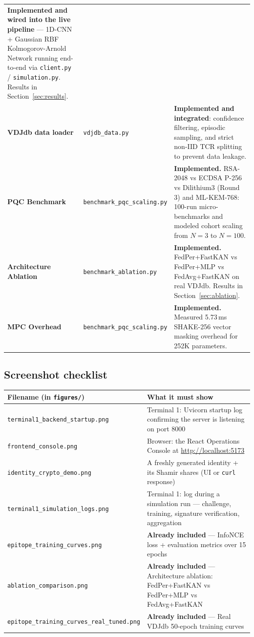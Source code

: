 \documentclass[11pt,a4paper]{article}
\begin{document}
\begin{center}
\begin{longtable}{@{}p{3.6cm}p{4.0cm}p{6.6cm}@{}}
\textbf{Implemented and wired into the live pipeline} --- 1D-CNN + Gaussian RBF Kolmogorov-Arnold Network running end-to-end via \lstinline|client.py| / \lstinline|simulation.py|. Results in Section~\ref{sec:results}. \\
\textbf{VDJdb data loader} & \lstinline|vdjdb_data.py| & \textbf{Implemented
and integrated}: confidence filtering, episodic sampling, and strict non-IID
TCR splitting to prevent data leakage. \\
\textbf{PQC Benchmark} & \lstinline|benchmark_pqc_scaling.py| & \textbf{Implemented.}
RSA-2048 vs ECDSA P-256 vs Dilithium3 (Round 3) and ML-KEM-768: 100-run micro-benchmarks and modeled cohort scaling from $N=3$ to $N=100$. \\
\textbf{Architecture Ablation} & \lstinline|benchmark_ablation.py| &
\textbf{Implemented.} FedPer+FastKAN vs FedPer+MLP vs FedAvg+FastKAN on
real VDJdb. Results in Section~\ref{sec:ablation}. \\
\textbf{MPC Overhead} & \lstinline|benchmark_pqc_scaling.py| & \textbf{Implemented.}
Measured 5.73\,ms SHAKE-256 vector masking overhead for 252K parameters. \\
\bottomrule
\end{longtable}
\end{center}

\subsection*{Screenshot checklist}
\begin{center}
\begin{longtable}{@{}p{5.5cm}p{7.5cm}@{}}
\toprule
\textbf{Filename (in \texttt{figures/})} & \textbf{What it must show} \\
\midrule
\endhead
\lstinline|terminal1_backend_startup.png| & Terminal 1: Uvicorn startup log
confirming the server is listening on port 8000 \\
\lstinline|frontend_console.png| & Browser: the React Operations Console at
\url{http://localhost:5173} \\
\lstinline|identity_crypto_demo.png| & A freshly generated identity + its Shamir shares (UI or \lstinline|curl| response) \\
\lstinline|terminal1_simulation_logs.png| & Terminal 1: log during a
simulation run --- challenge, training, signature verification,
aggregation \\
\lstinline|epitope_training_curves.png| & \textbf{Already included} ---
InfoNCE loss + evaluation metrics over 15 epochs \\
\lstinline|ablation_comparison.png| & \textbf{Already included} ---
Architecture ablation: FedPer+FastKAN vs FedPer+MLP vs FedAvg+FastKAN \\
\lstinline|epitope_training_curves_real_tuned.png| & \textbf{Already
included} --- Real VDJdb 50-epoch training curves \\
\bottomrule
\end{longtable}
\end{center}
\end{document}
